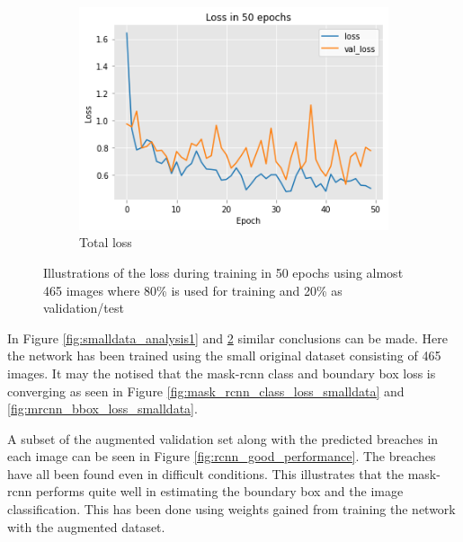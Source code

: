\documentclass[../Head/Main.tex]{subfiles}
\begin{document}
\begin{figure}[H]
\begin{subfigure}[t]{.32\textwidth}
        \centering
        \includegraphics[width=\textwidth]{../Figures/rcnn_results/loss/plot_smalldata1.png}
        \caption{Total loss}
        \label{fig:total_loss_smalldata}
    \end{subfigure}
    \caption{Illustrations of the loss during training in 50 epochs using almost 465 images where 80\% is used for training and 20\% as validation/test}
     \label{fig:smalldata_analysis2}
\end{figure}

In Figure \ref{fig:smalldata_analysis1} and \ref{fig:smalldata_analysis2} similar conclusions can be made. Here the network has been trained using the small original dataset consisting of 465 images. It may the notised that the mask-rcnn class and boundary box loss is converging as seen in Figure \ref{fig:mask_rcnn_class_loss_smalldata} and \ref{fig:mrcnn_bbox_loss_smalldata}. 

A subset of the augmented validation set along with the predicted breaches in each image can be seen in Figure \ref{fig:rcnn_good_performance}. The breaches have all been found even in difficult conditions. This illustrates that the mask-rcnn performs quite well in estimating the boundary box and the image classification. This has been done using weights gained from training the network with the augmented dataset. 
\end{document}
